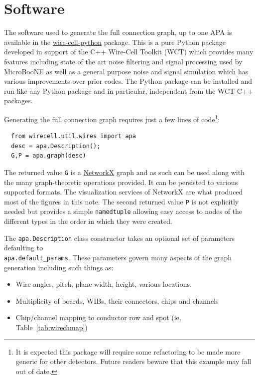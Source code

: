 \documentclass[pdftex,12pt,letter]{article}
\begin{document}
\section{Software}

The software used to generate the full connection graph, up to one APA
is available in the
\href{https://github.com/wirecell/wire-cell-python}{wire-cell-python}
package.  This is a pure Python package developed in support of the
C++ Wire-Cell Toolkit (WCT) which provides many features including
state of the art noise filtering and signal processing used by
MicroBooNE as well as a general purpose noise and signal simulation
which has various improvements over prior codes.  The Python package
can be installed and run like any Python package and in particular,
independent from the WCT C++ packages.

Generating the full connection graph requires just a few lines of
code\footnote{It is expected this package will require some refactoring to be made more generic for other detectors.  Future readers beware that this example may fall out of date.}:

\begin{verbatim}
  from wirecell.util.wires import apa
  desc = apa.Description();
  G,P = apa.graph(desc)
\end{verbatim}

The returned value \texttt{G} is a
\href{https://networkx.github.io/}{NetworkX} graph and as such can be
used along with the many graph-theoretic operations provided.  It can be
persisted to various supported formats.  The visualization services of
NetworkX are what produced most of the figures in this note.  The
second returned value \texttt{P} is not explicitly needed but provides
a simple \texttt{namedtuple} allowing easy access to nodes of the
different types in the order in which they were created.

The \texttt{apa.Description} class constructor takes an optional set
of parameters defaulting to \\ \texttt{apa.default\_params}.  These
parameters govern many aspects of the graph generation including such
things as:

\begin{itemize}
\item Wire angles, pitch, plane width, height, various locations.
\item Multiplicity of boards, WIBs, their connectors, chips and channels
\item Chip/channel mapping to conductor row and spot (ie, Table~\ref{tab:wirechmap})
\end{itemize}
\end{document}
